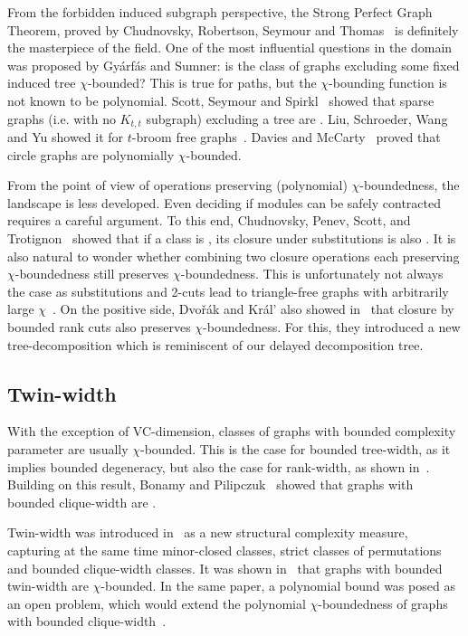 From the forbidden induced subgraph perspective, the Strong Perfect Graph Theorem, proved by Chudnovsky, Robertson, Seymour
and Thomas~\cite{CRST06} is definitely the masterpiece of the field. One of the most influential questions in the domain was proposed by Gy\'arf\'as and Sumner: is the class of graphs excluding some fixed induced tree $\chi$-bounded? This is true for paths, but the $\chi$-bounding function is not known to be polynomial. Scott, Seymour and Spirkl~\cite{SSS23} showed that sparse graphs (i.e. with no $K_{t,t}$ subgraph) excluding a tree are \pcb. Liu, Schroeder, Wang and Yu showed it for $t$-broom free graphs~\cite{LSWY21}. 
Davies and McCarty~\cite{DM21} proved that circle graphs are polynomially $\chi$-bounded.

From the point of view of operations preserving (polynomial) $\chi$-boundedness, the landscape is less developed. Even deciding if modules can be safely contracted requires a careful argument. To this end,
Chudnovsky, Penev, Scott, and Trotignon~\cite{CPST13} showed that if a class is \pcb, its closure under substitutions is also \pcb. It is also natural to wonder whether combining two closure operations each preserving $\chi$-boundedness still preserves $\chi$-boundedness. This is unfortunately not always the case as substitutions and 2-cuts lead to triangle-free graphs with arbitrarily large $\chi$~\cite{BBDGT23}. On the positive side, Dvo\v{r}\'ak and  Kr\'al’ also showed in~\cite{DK12} that closure by bounded rank cuts also  preserves $\chi$-boundedness. For this, they introduced a new tree-decomposition which is reminiscent of our delayed decomposition tree.

\subsection{Twin-width}
With the exception of VC-dimension, classes of graphs with bounded complexity parameter are usually $\chi$-bounded. This is the case for bounded tree-width, as it implies bounded degeneracy, but also the case for rank-width, as shown in~\cite{DK12}. Building on this result,
Bonamy and Pilipczuk~\cite{BP19} showed that graphs with bounded clique-width are \pcb.

Twin-width was introduced in~\cite{BKTW21} as a new structural complexity measure, capturing at the same time minor-closed classes, strict classes of permutations and bounded clique-width classes.
It was shown in~\cite{BGKTW21} that graphs with bounded twin-width are $\chi$-bounded. In the same paper, a polynomial bound was posed as an open problem, which would extend the polynomial $\chi$-boundedness of graphs with bounded clique-width~\cite{BP19}.


